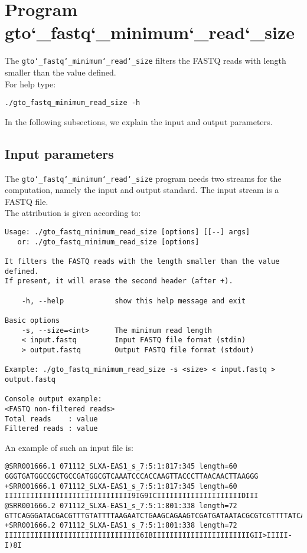 \section{Program gto\char`_fastq\char`_minimum\char`_read\char`_size}
The \texttt{gto\char`_fastq\char`_minimum\char`_read\char`_size} filters the FASTQ reads with length smaller than the value defined.\\
For help type:
\begin{lstlisting}
./gto_fastq_minimum_read_size -h
\end{lstlisting}
In the following subsections, we explain the input and output parameters.

\subsection*{Input parameters}

The \texttt{gto\char`_fastq\char`_minimum\char`_read\char`_size} program needs two streams for the computation, namely the input and output standard. The input stream is a FASTQ file.\\
The attribution is given according to:
\begin{lstlisting}
Usage: ./gto_fastq_minimum_read_size [options] [[--] args]
   or: ./gto_fastq_minimum_read_size [options]

It filters the FASTQ reads with the length smaller than the value defined. 
If present, it will erase the second header (after +).

    -h, --help            show this help message and exit

Basic options
    -s, --size=<int>      The minimum read length
    < input.fastq         Input FASTQ file format (stdin)
    > output.fastq        Output FASTQ file format (stdout)

Example: ./gto_fastq_minimum_read_size -s <size> < input.fastq > output.fastq

Console output example:
<FASTQ non-filtered reads>
Total reads    : value
Filtered reads : value
\end{lstlisting}
An example of such an input file is:
\begin{lstlisting}
@SRR001666.1 071112_SLXA-EAS1_s_7:5:1:817:345 length=60
GGGTGATGGCCGCTGCCGATGGCGTCAAATCCCACCAAGTTACCCTTAACAACTTAAGGG
+SRR001666.1 071112_SLXA-EAS1_s_7:5:1:817:345 length=60
IIIIIIIIIIIIIIIIIIIIIIIIIIIIII9IG9ICIIIIIIIIIIIIIIIIIIIIDIII
@SRR001666.2 071112_SLXA-EAS1_s_7:5:1:801:338 length=72
GTTCAGGGATACGACGTTTGTATTTTAAGAATCTGAAGCAGAAGTCGATGATAATACGCGTCGTTTTATCAT
+SRR001666.2 071112_SLXA-EAS1_s_7:5:1:801:338 length=72
IIIIIIIIIIIIIIIIIIIIIIIIIIIIIIII6IBIIIIIIIIIIIIIIIIIIIIIIIGII>IIIII-I)8I
\end{lstlisting}

